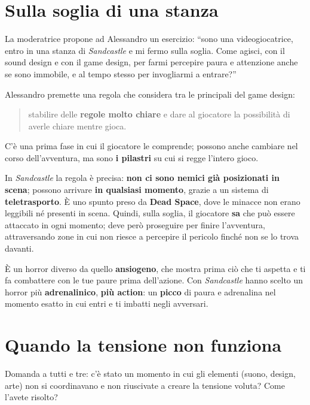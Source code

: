 \section{Sulla soglia di una stanza}
\label{sec:c1-3-soglia}

La moderatrice propone ad Alessandro un esercizio: ``sono una videogiocatrice,
entro in una stanza di \emph{Sandcastle} e mi fermo sulla soglia. Come agisci,
con il sound design e con il game design, per farmi percepire paura e
attenzione anche se sono immobile, e al tempo stesso per invogliarmi a
entrare?''

Alessandro premette una regola che considera tra le principali del game design:
\begin{quote}
  stabilire delle \textbf{regole molto chiare} e dare al giocatore la
  possibilità di averle chiare mentre gioca.
\end{quote}
C'è una prima fase in cui il giocatore le comprende; possono anche cambiare nel
corso dell'avventura, ma sono \textbf{i pilastri} su cui si regge l'intero gioco.

In \emph{Sandcastle} la regola è precisa: \textbf{non ci sono nemici già
posizionati in scena}; possono arrivare \textbf{in qualsiasi momento}, grazie a
un sistema di \textbf{teletrasporto}. È uno spunto preso da \textbf{Dead Space},
dove le minacce non erano leggibili né presenti in scena. Quindi, sulla soglia,
il giocatore \textbf{sa} che può essere attaccato in ogni momento; deve però
proseguire per finire l'avventura, attraversando zone in cui non riesce a
percepire il pericolo finché non se lo trova davanti.

È un horror diverso da quello \textbf{ansiogeno}, che mostra prima ciò che ti
aspetta e ti fa combattere con le tue paure prima dell'azione. Con
\emph{Sandcastle} hanno scelto un horror più \textbf{adrenalinico},
\textbf{più action}: un \textbf{picco} di paura e adrenalina nel momento esatto
in cui entri e ti imbatti negli avversari.

\section{Quando la tensione non funziona}
\label{sec:c1-3-iterazione}

Domanda a tutti e tre: c'è stato un momento in cui gli elementi (suono, design,
arte) non si coordinavano e non riuscivate a creare la tensione voluta? Come
l'avete risolto?

